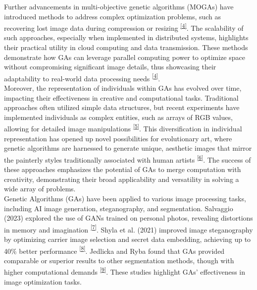 \documentclass[10pt, conference]{IEEEtran}
\begin{document}
Further advancements in multi-objective genetic algorithms (MOGAs) have introduced methods to address complex optimization problems, such as recovering lost image data during compression or resizing \hypertarget{ref}{\textsuperscript{\hyperref[sec:4r]{[4]}\label{sec:4}}}. The scalability of such approaches, especially when implemented in distributed systems, highlights their practical utility in cloud computing and data transmission. These methods demonstrate how GAs can leverage parallel computing power to optimize space without compromising significant image details, thus showcasing their adaptability to real-world data processing needs \hypertarget{ref}{\textsuperscript{\hyperref[sec:4r]{[4]}\label{sec:4}}}.\\

Moreover, the representation of individuals within GAs has evolved over time, impacting their effectiveness in creative and computational tasks. Traditional approaches often utilized simple data structures, but recent experiments have implemented individuals as complex entities, such as arrays of RGB values, allowing for detailed image manipulations \hypertarget{ref}{\textsuperscript{\hyperref[sec:5r]{[5]}\label{sec:5}}}. This diversification in individual representation has opened up novel possibilities for evolutionary art, where genetic algorithms are harnessed to generate unique, aesthetic images that mirror the painterly styles traditionally associated with human artists \hypertarget{ref}{\textsuperscript{\hyperref[sec:6r]{[6]}\label{sec:6}}}. The success of these approaches emphasizes the potential of GAs to merge computation with creativity, demonstrating their broad applicability and versatility in solving a wide array of problems. \\


Genetic Algorithms (GAs) have been applied to various image processing tasks, including AI image generation, steganography, and segmentation. Salvaggio (2023) explored the use of GANs trained on personal photos, revealing distortions in memory and imagination \hypertarget{ref}{\textsuperscript{\hyperref[sec:7r]{[7]}\label{sec:7}}}. Shyla et al. (2021) improved image steganography by optimizing carrier image selection and secret data embedding, achieving up to 40\% better performance \hypertarget{ref}{\textsuperscript{\hyperref[sec:8r]{[8]}\label{sec:8}}}. Jedlicka and Ryba found that GAs provided comparable or superior results to other segmentation methods, though with higher computational demands \hypertarget{ref}{\textsuperscript{\hyperref[sec:9r]{[9]}\label{sec:9}}}. These studies highlight GAs' effectiveness in image optimization tasks. \\
\end{document}
